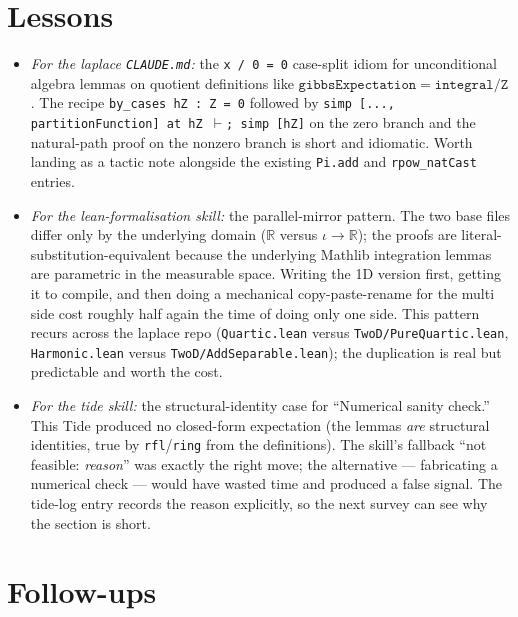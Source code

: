\documentclass[11pt]{article}
\begin{document}
\section{Lessons}

\begin{itemize}[leftmargin=*]
\item \emph{For the laplace \texttt{CLAUDE.md}:} the
\texttt{x / 0 = 0} case-split idiom for unconditional algebra lemmas
on quotient definitions like
$\texttt{gibbsExpectation} = \texttt{integral} / \texttt{Z}$. The
recipe \texttt{by\_cases hZ : Z = 0} followed by
\texttt{simp [..., partitionFunction] at hZ $\vdash$; simp [hZ]} on
the zero branch and the natural-path proof on the nonzero branch is
short and idiomatic. Worth landing as a tactic note alongside the
existing \texttt{Pi.add} and \texttt{rpow\_natCast} entries.

\item \emph{For the lean-formalisation skill:} the parallel-mirror
pattern. The two base files differ only by the underlying domain
($\mathbb{R}$ versus $\iota \to \mathbb{R}$); the proofs are
literal-substitution-equivalent because the underlying Mathlib
integration lemmas are parametric in the measurable space. Writing
the 1D version first, getting it to compile, and then doing a
mechanical copy-paste-rename for the multi side cost roughly half
again the time of doing only one side. This pattern recurs across
the laplace repo (\texttt{Quartic.lean} versus \texttt{TwoD/PureQuartic.lean},
\texttt{Harmonic.lean} versus \texttt{TwoD/AddSeparable.lean}); the
duplication is real but predictable and worth the cost.

\item \emph{For the tide skill:} the structural-identity case for
``Numerical sanity check.'' This Tide produced no closed-form
expectation (the lemmas \emph{are} structural identities, true by
\texttt{rfl}/\texttt{ring} from the definitions). The skill's
fallback ``not feasible: \emph{reason}'' was exactly the right move;
the alternative — fabricating a numerical check — would have wasted
time and produced a false signal. The tide-log entry records the
reason explicitly, so the next survey can see why the section is
short.
\end{itemize}

\section{Follow-ups}
\end{document}
